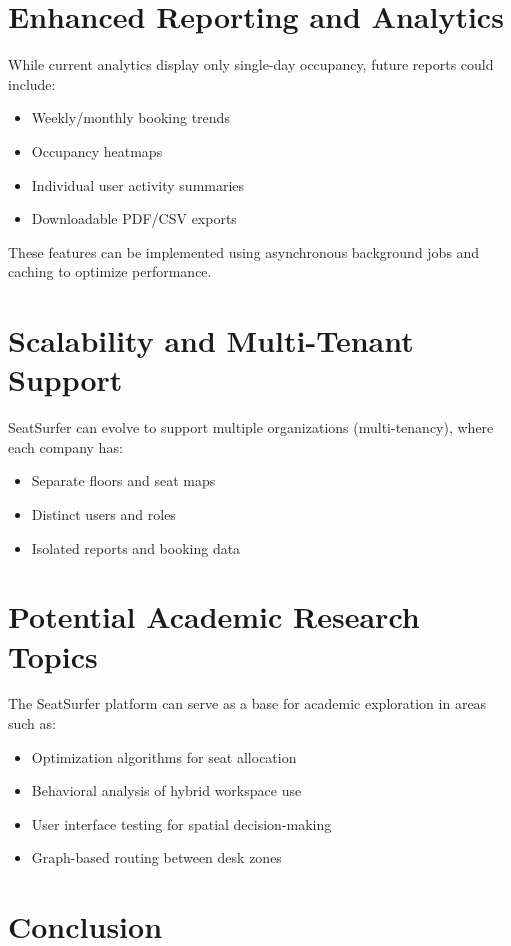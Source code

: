 \documentclass[12pt,a4paper]{report}
\begin{document}
\section{Enhanced Reporting and Analytics}

While current analytics display only single-day occupancy, future reports could include:

\begin{itemize}
    \item Weekly/monthly booking trends
    \item Occupancy heatmaps
    \item Individual user activity summaries
    \item Downloadable PDF/CSV exports
\end{itemize}

These features can be implemented using asynchronous background jobs and caching to optimize performance.

\section{Scalability and Multi-Tenant Support}

SeatSurfer can evolve to support multiple organizations (multi-tenancy), where each company has:
\begin{itemize}
    \item Separate floors and seat maps
    \item Distinct users and roles
    \item Isolated reports and booking data
\end{itemize}

\section{Potential Academic Research Topics}

The SeatSurfer platform can serve as a base for academic exploration in areas such as:
\begin{itemize}
    \item Optimization algorithms for seat allocation
    \item Behavioral analysis of hybrid workspace use
    \item User interface testing for spatial decision-making
    \item Graph-based routing between desk zones
\end{itemize}

\section{Conclusion}
\end{document}

